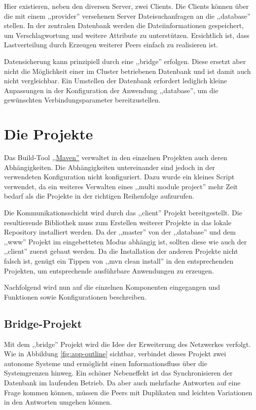 \documentclass[oneside, ngerman, toc=bibliography,bibliography=totoc,listof=entryprefix, open=right,numbers=noenddot,fontsize=12pt]{scrbook}
\begin{document}
 

Hier existieren, neben den diversen Server, zwei Clients. Die Clients können über die mit einem ,,provider'' versehenen Server Dateisuchanfragen an die ,,database'' stellen.
In der zentralen Datenbank werden die Dateiinformationen gespeichert, um Verschlagwortung und weitere Attribute zu unterstützen.
Ersichtlich ist, dass Lastverteilung durch Erzeugen weiterer Peers einfach zu realisieren ist. 

Datensicherung kann prinzipiell durch eine ,,bridge'' erfolgen. Diese ersetzt aber nicht die Möglichkeit einer im Cluster betriebenen Datenbank und ist damit auch nicht vergleichbar. Ein Umstellen der Datenbank erfordert lediglich kleine  Anpassungen  in der Konfiguration  der Anwendung ,,database'', um die gewünschten Verbindungsparameter bereitzustellen.


\section{Die Projekte}

Das Build-Tool \href{https://maven.apache.org/}{,,Maven''} verwaltet in den einzelnen Projekten auch deren Abhängigkeiten. Die Abhängigkeiten untereinander sind jedoch 
in der verwendeten Konfiguration nicht konfiguriert. Dazu wurde ein kleines Script verwendet, da ein weiteres Verwalten eines ,,multi module project'' mehr Zeit bedarf als die Projekte in der richtigen Reihenfolge aufzurufen. 

Die Kommunikationsschicht wird durch das ,,client'' Projekt bereitgestellt.
Die resultierende Bibliothek muss zum Erstellen weiterer Projekte in das lokale Repository installiert werden.
Da der ,,master'' von der ,,database'' und dem ,,www'' Projekt im eingebetteten Modus abhängig ist, sollten diese wie auch der ,,client'' zuerst gebaut werden.
Da die Installation der anderen Projekte nicht falsch ist, genügt ein Tippen von ,,mvn clean install'' in den entsprechenden Projekten, um entsprechende ausführbare Anwendungen zu erzeugen.

Nachfolgend wird nun auf die einzelnen Komponenten eingegangen und Funktionen sowie Konfigurationen beschreiben.


\subsection{Bridge-Projekt}
Mit dem ,,bridge'' Projekt wird die Idee der Erweiterung des Netzwerkes verfolgt. Wie in Abbildung \ref{fig:app-outline} sichtbar, verbindet dieses Projekt zwei autonome Systeme und ermöglicht einen Informationsfluss über die Systemgrenzen hinweg. Ein schöner Nebeneffekt ist das Synchronisieren der Datenbank im laufenden Betrieb. Da aber auch mehrfache Antworten auf eine Frage kommen können, müssen die Peers mit Duplikaten und leichten Variationen in den Antworten umgehen können.
\end{document}
